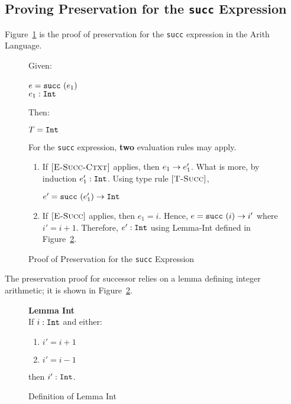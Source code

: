 \documentclass{report}
\newcommand{\rel}[1]{\mbox{\sc [#1]}}
\begin{document}
\eject
\subsection{Proving Preservation for the \texttt{succ} Expression}

Figure~\ref{fig:succProofPreservation} is the proof of preservation for the \texttt{succ} expression in the Arith Language.

\begin{figure}[ht!]
Given:
\begin{center}
   $e = \mbox{\tt succ}~(e_1)$~\\
   ${e_1} : {\mbox{\tt Int}}$
\end{center}
Then:
\begin{center}
   $T = \mbox{\tt Int}$
\end{center}
For the \texttt{succ} expression, \textbf{two} evaluation rules may apply.
\begin{enumerate}

    \item If $\rel{E-Succ-Ctxt}$ applies, then ${e_1} \rightarrow {e'_1}$.  What is more, by induction ${e'_1} : {\mbox{\tt Int}}$.  Using type rule $\rel{T-Succ}$,
    
    \begin{center}
      ${e' = \mbox{\tt succ}~(e'_1)} \rightarrow {\mbox{\tt Int}}$
    \end{center}
      
    \item If $\rel{E-Succ}$ applies, then $e_1 = i$.  Hence, ${e = \mbox{\tt succ}~(i)} \rightarrow {i'}$ where $i' = i + 1$.  Therefore, ${e'} : {\mbox{\tt Int}}$ using Lemma-Int defined in Figure~\ref{fig:lemmaInt}.
    
\end{enumerate}
	
  \caption{Proof of Preservation for the \texttt{succ} Expression}\label{fig:succProofPreservation}
\end{figure} 

The preservation proof for successor relies on a lemma defining integer arithmetic; it is shown in Figure~\ref{fig:lemmaInt}.

\begin{figure}[ht!]

\textbf{Lemma Int}~\\

If ${i} : {\mbox{\tt Int}}$ and either:

\begin{enumerate}

    \item $i' = i + 1$
      
    \item $i' = i - 1$
    
\end{enumerate}

then ${i'} : {\mbox{\tt Int}}$.
	
  \caption{Definition of Lemma Int}\label{fig:lemmaInt}
\end{figure} 
\end{document}
